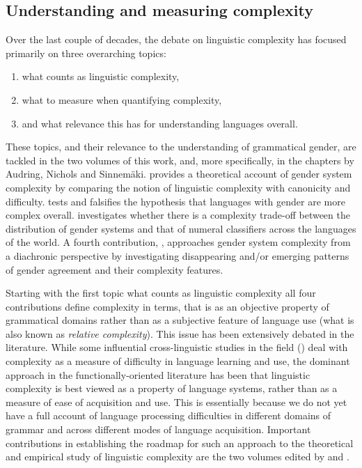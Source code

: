 \documentclass[output=collectionpaper]{langsci/langscibook}
\begin{document}
  \subsection{Understanding and measuring complexity}
\label{sec:WDG:2.1}
Over the last couple of decades, the debate on linguistic complexity has focused primarily on three overarching topics:

\begin{enumerate}[label=(\roman*)]
\item what counts as linguistic complexity,
\item what to measure when quantifying complexity,
\item and what relevance this has for understanding languages overall.
\end{enumerate}

\noindent These topics, and their relevance to the understanding of grammatical gender, are tackled in the two volumes of this work, and, more specifically, in the chapters by Audring, Nichols and Sinnemäki.  provides a theoretical account of gender system complexity by comparing the notion of linguistic complexity with canonicity and difficulty.  tests and falsifies the hypothesis that languages with gender are more complex overall.  investigates whether there is a complexity trade-off between the distribution of gender systems and that of numeral classifiers across the languages of the world. A fourth contribution, , approaches gender system complexity from a diachronic perspective by investigating disappearing and/or emerging patterns of gender agreement and their complexity features.

Starting with the first topic \textendash{} what counts as linguistic complexity \textendash{} all four contributions define complexity in  terms, that is as an objective property of grammatical domains rather than as a subjective feature of language use (what is also known as \emph{relative complexity}). This issue has been extensively debated in the literature. While some influential cross-linguistic studies in the field (\citealt{Kusters2003,Kusters2008}) deal with complexity as a measure of difficulty in language learning and use, the dominant approach in the functionally-oriented literature has been that linguistic complexity is best viewed as a property of language systems, rather than as a measure of ease of acquisition and use. This is essentially because we do not yet have a full account of language processing difficulties in different domains of grammar and across different modes of language acquisition. Important contributions in establishing the roadmap for such an approach to the theoretical and empirical study of linguistic complexity are the two volumes edited by \citet{Miestamo2008b} and \citet{Sampson2009}.
\end{document}
